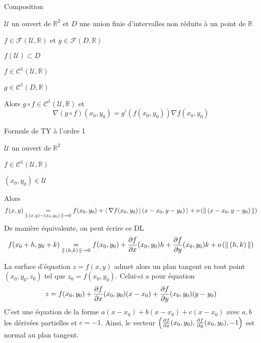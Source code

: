     \begin{prop}{Composition}{}
        \begin{soient}
            \item $ \mathcal{U}$ un ouvert de $\mathbb{R}^2$ et $D$ une union finie d’intervalles non réduits à un point de $\mathbb{R}$
            \item $f \in \mathcal{F}(\mathcal{U},\mathbb{R})$ et $g \in \mathcal{F}(D,\mathbb{R})$
        \end{soient}
        \begin{suppose}
            \item $f(\mathcal{U}) \subset D$
            \item $f \in \mathcal{C}^1(\mathcal{U},\mathbb{R})$
            \item $g \in \mathcal{C}^1(D,\mathbb{R})$
        \end{suppose}
        Alors $g \circ f \in \mathcal{C}^1(\mathcal{U},\mathbb{R})$ et 
        \[ \nabla (g \circ f)(x_0,y_0) = g'(f(x_0,y_0)) \nabla f(x_0,y_0) \] 
    \end{prop}

    \begin{theo}{Formule de TY à l’ordre 1}{}
        \begin{soient}
            \item $\mathcal{U}$ un ouvert de $\mathbb{R}^2$
            \item $f\in \mathcal{C}^1(\mathcal{U},\mathbb{R})$
            \item $(x_0,y_0) \in \mathcal{U}$
        \end{soient}
        Alors \[  f(x,y) \underset{\left\lVert \,(x,y)-(x_0,y_0) \, \right\rVert \rightarrow 0}{=} f(x_0,y_0) + \left<\,\nabla f(x_0,y_0)\,\middle|\,(x-x_0,y-y_0)\,\right> + o\left(\left\lVert \,(x-x_0,y-y_0) \, \right\rVert\right) \]
        De manière équivalente, on peut écrire ce DL
        \[ f(x_0 + h,y_0 + k) \underset{\left\lVert \,(h,k) \, \right\rVert \rightarrow 0}{=} f(x_0,y_0) + \frac{\partial f}{\partial x}(x_0,y_0) h + \frac{\partial f}{\partial y}(x_0,y_0)k + o\left(\left\lVert \,(h,k) \, \right\rVert\right) \]
    \end{theo}

    La surface d’équation $z = f(x,y)$ admet alors un plan tangent en tout point $(x_0,y_0,z_0)$ tel que $z_0 = f(x_0, y_0)$. Celui-ci a pour équation 
    \[ z = f(x_0, y_0) + \frac{\partial f}{\partial x}(x_0,y_0)(x-x_0) + \frac{\partial f}{\partial y}(x_0,y_0)(y - y_0) \]   
    C’est une équation de la forme $a(x-x_0) + b(x - x_0) + c(x-x_0)$ avec $a,b$ les dérivées partielles et $c = -1$. Ainsi, le vecteur $\left(\frac{\partial f}{\partial x}(x_0,y_0), \frac{\partial f}{\partial y}(x_0,y_0) , -1\right)$ est normal au plan tangent. 

